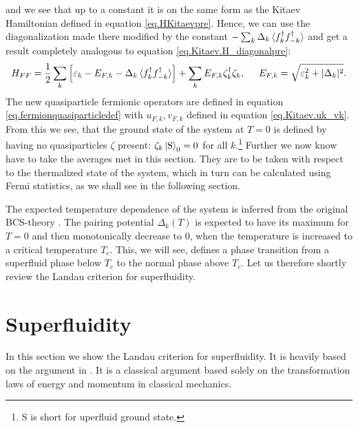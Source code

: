 and we see that up to a constant it is on the same form as the Kitaev Hamiltonian defined in equation \eqref{eq.HKitaevpre}. Hence, we can use the diagonalization made there modified by the constant $-\sum_k \Delta_k\braket {f^\dagger_k f^\dagger_{-k}} $ and get a result completely analogous to equation \eqref{eq.Kitaev.H_diagonalpre}: 
\begin{equation}
H_{FF} = \frac{1}{2}\sum_k \left[\varepsilon_k-E_{F,k}-\Delta_k\braket {f^\dagger_k f^\dagger_{-k}}\right] + \sum_k E_{F,k} \zeta^\dagger_k \zeta_k, \hspace{0.5cm} E_{F,k} = \sqrt{\varepsilon_k^2 + |\Delta_k|^2}.
\label{eq.Kitaev.HFF_diagonal}
\end{equation}
The new quasiparticle fermionic operators are defined in equation \eqref{eq.fermionquasiparticledef} with $u_{F,k},v_{F,k}$ defined in equation \eqref{eq.Kitaev.uk_vk}. From this we see, that the ground state of the system at $T=0$ is defined by having no quasiparticles $\zeta$ present: $\zeta_k \ket{\text{S}}_0 = 0$ for all $k$.\footnote{S is short for uperfluid ground state.} Further we now know have to take the averages met in this section. They are to be taken with respect to the thermalized state of the system, which in turn can be calculated using Fermi statistics, as we shall see in the following section. 

The expected temperature dependence of the system is inferred from the original BCS-theory \cite{Tinkham,LandauStatPhys2,PlischkeStatPhys}. The pairing potential $\Delta_k(T)$ is expected to have its maximum for $T = 0$ and then monotonically decrease to 0, when the temperature is increased to a critical temperature $T_c$. This, we will see, defines a phase transition from a superfluid phase below $T_c$ to the normal phase above $T_c$. Let us therefore shortly review the Landau criterion for superfluidity. 


\section{Superfluidity} \label{sec.Superfluidity}
In this section we show the Landau criterion for superfluidity. It is heavily based on the argument in \cite{LandauStatPhys2}. It is a classical argument based solely on the transformation laws of energy and momentum in classical mechanics. 

